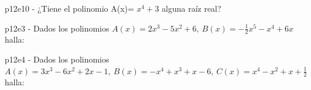 \documentclass[spanish, 11pt]{exam}
\begin{document}
    \begin{questions}
    \question p12e10 - ¿Tiene el polinomio A(x)= $x^4 +3$ alguna raíz real?
        \begin{multicols}{3} 
        \end{multicols}
        \question p12e3 - Dados los polinomios $ A(x)=2{x^3} - 5{x^2} + 6, \  B(x)=- \frac{1}{2}{x^5} - {x^4} + 6x$ halla:
        \begin{multicols}{3} 
        \end{multicols}
        \question p12e4 - Dados los polinomios $ A(x)=3{x^3} - 6{x^2} + 2x - 1, \  B(x)=- {x^4} + {x^3} + x - 6, \  C(x)={x^4} - {x^2} + x + \frac{1}{2}$ halla:
        \begin{multicols}{3} 

\end{multicols}
\end{questions}
\end{document}
